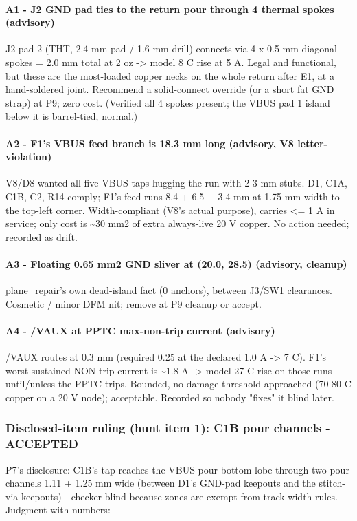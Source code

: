 \documentclass[11pt,a4paper]{article}
\begin{document}
\paragraph*{A1 - J2 GND pad ties to the return pour through 4 thermal spokes (advisory)}
J2 pad 2 (THT, 2.4 mm pad / 1.6 mm drill) connects via 4 x 0.5 mm diagonal spokes = 2.0 mm total at 2 oz -\textgreater{} model 8 C rise at 5 A. Legal and functional, but these are the most-loaded copper necks on the whole return after E1, at a hand-soldered joint. Recommend a solid-connect override (or a short fat GND strap) at P9; zero cost. (Verified all 4 spokes present; the VBUS pad 1 island below it is barrel-tied, normal.)

\paragraph*{A2 - F1's VBUS feed branch is 18.3 mm long (advisory, V8 letter-violation)}
V8/D8 wanted all five VBUS taps hugging the run with 2-3 mm stubs. D1, C1A, C1B, C2, R14 comply; F1's feed runs 8.4 + 6.5 + 3.4 mm at 1.75 mm width to the top-left corner. Width-compliant (V8's actual purpose), carries \textless{}= 1 A in service; only cost is \textasciitilde{}30 mm2 of extra always-live 20 V copper. No action needed; recorded as drift.

\paragraph*{A3 - Floating 0.65 mm2 GND sliver at (20.0, 28.5) (advisory, cleanup)}
plane\_repair's own dead-island fact (0 anchors), between J3/SW1 clearances. Cosmetic / minor DFM nit; remove at P9 cleanup or accept.

\paragraph*{A4 - /VAUX at PPTC max-non-trip current (advisory)}
/VAUX routes at 0.3 mm (required 0.25 at the declared 1.0 A -\textgreater{} 7 C). F1's worst sustained NON-trip current is \textasciitilde{}1.8 A -\textgreater{} model 27 C rise on those runs until/unless the PPTC trips. Bounded, no damage threshold approached (70-80 C copper on a 20 V node); acceptable. Recorded so nobody "fixes" it blind later.

\subsubsection*{Disclosed-item ruling (hunt item 1): C1B pour channels - ACCEPTED}
P7's disclosure: C1B's tap reaches the VBUS pour bottom lobe through two pour channels 1.11 + 1.25 mm wide (between D1's GND-pad keepouts and the stitch-via keepouts) - checker-blind because zones are exempt from track width rules. Judgment with numbers:
\end{document}
